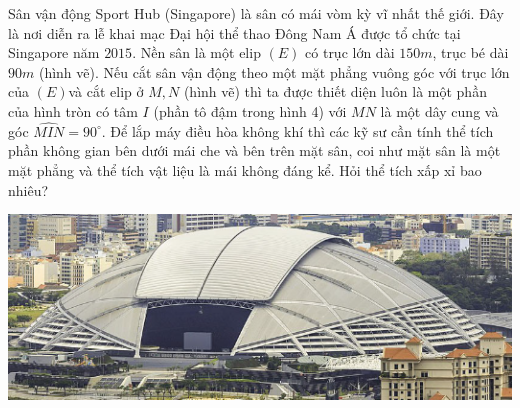 \begin{ex}%
Sân vận động Sport Hub (Singapore) là sân có mái vòm kỳ vĩ nhất thế giới. Đây là nơi diễn ra lễ khai mạc Đại hội thể thao Đông Nam Á được tổ chức tại Singapore năm $2015$. Nền sân là một elip $\left( E \right)$ có trục lớn dài $150m$, trục bé dài $90m$ (hình vẽ). Nếu cắt sân vận động theo một mặt phẳng vuông góc với trục lớn của $\left( E \right)$và cắt elip ở $M,N$ (hình vẽ) thì ta được thiết diện luôn là một phần của hình tròn có tâm $I$ (phần tô đậm trong hình 4) với $MN$ là một dây cung và góc $\widehat{MIN}=90^{\circ}.$ Để lắp máy điều hòa không khí thì các kỹ sư cần tính thể tích phần không gian bên dưới mái che và bên trên mặt sân, coi như mặt sân là một mặt phẳng và thể tích vật liệu là mái không đáng kể. Hỏi thể tích xấp xỉ bao nhiêu?
  \begin{center}
  {\includegraphics[scale=0.8]{image/Cau3_C4B3CD3.png}\\
}
\end{center}
\end{ex}
